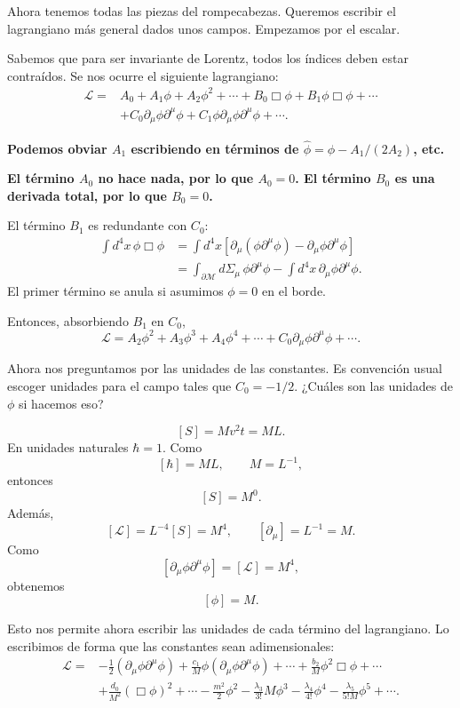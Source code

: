 \documentclass[11pt,a4paper]{article}
\begin{document}
Ahora tenemos todas las piezas del rompecabezas. Queremos escribir el lagrangiano más general dados unos campos. Empezamos por el escalar.

Sabemos que para ser invariante de Lorentz, todos los índices deben estar contraídos. Se nos ocurre el siguiente lagrangiano:
\begin{align*}
  \mathcal L
  ={}&A_0+A_1\phi+A_2\phi^2+\cdots
     +B_0\Box\phi+B_1\phi\Box\phi+\cdots \\
    &+C_0\partial_\mu\phi\partial^\mu\phi
     +C_1\phi\partial_\mu\phi\partial^\mu\phi+\cdots.
\end{align*}

{\bf Podemos obviar $A_1$ escribiendo en términos de
$\widehat\phi=\phi-A_1/(2A_2)$, etc.}

{\bf El término $A_0$ no hace nada, por lo que $A_0=0$. El término $B_0$ es una derivada total, por lo que $B_0=0$.}

El término $B_1$ es redundante con $C_0$:
\begin{align*}
  \int d^4x\,\phi\Box\phi
  &=\int d^4x\left[
      \partial_\mu(\phi\partial^\mu\phi)
      -\partial_\mu\phi\partial^\mu\phi
    \right] \\
  &=\int_{\partial\mathcal M}d\Sigma_\mu\,\phi\partial^\mu\phi
    -\int d^4x\,\partial_\mu\phi\partial^\mu\phi.
\end{align*}
El primer término se anula si asumimos $\phi=0$ en el borde.

Entonces, absorbiendo $B_1$ en $C_0$,
\[
  \mathcal L
  =A_2\phi^2+A_3\phi^3+A_4\phi^4+\cdots
   +C_0\partial_\mu\phi\partial^\mu\phi+\cdots.
\]

Ahora nos preguntamos por las unidades de las constantes. Es convención usual escoger unidades para el campo tales que $C_0=-1/2$. ¿Cuáles son las unidades de $\phi$ si hacemos eso?

\[
  [S]=Mv^2t=ML.
\]
En unidades naturales $\hbar=1$. Como
\[
  [\hbar]=ML,
  \qquad
  M=L^{-1},
\]
entonces
\[
  [S]=M^0.
\]
Además,
\[
  [\mathcal L]=L^{-4}[S]=M^4,
  \qquad
  [\partial_\mu]=L^{-1}=M.
\]
Como
\[
  [\partial_\mu\phi\partial^\mu\phi]=[\mathcal L]=M^4,
\]
obtenemos
\[
  [\phi]=M.
\]

Esto nos permite ahora escribir las unidades de cada término del lagrangiano. Lo escribimos de forma que las constantes sean adimensionales:
\begin{align*}
  \mathcal L={}&
  -\frac12(\partial_\mu\phi\partial^\mu\phi)
  +\frac{c_1}{M}\phi(\partial_\mu\phi\partial^\mu\phi)+\cdots
  +\frac{b_2}{M}\phi^2\Box\phi+\cdots \\
  &+\frac{d_0}{M^2}(\Box\phi)^2+\cdots
  -\frac{m^2}{2}\phi^2
  -\frac{\lambda_3}{3!}M\phi^3
  -\frac{\lambda_4}{4!}\phi^4
  -\frac{\lambda_5}{5!M}\phi^5+\cdots.
\end{align*}
\end{document}
